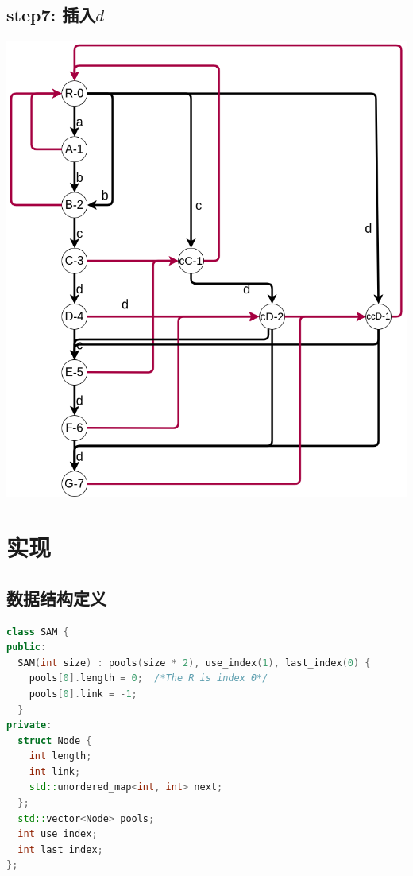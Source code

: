 \documentclass{article}
\begin{document}
\subsection{step7: 插入$d$}
\includegraphics[scale=0.5]{step7.png} \par

\section{实现}
\subsection{数据结构定义}
\begin{lstlisting}[language=C++, caption={Definition}]
class SAM {
public:
  SAM(int size) : pools(size * 2), use_index(1), last_index(0) {
    pools[0].length = 0;  /*The R is index 0*/
    pools[0].link = -1;
  }
private:
  struct Node {
    int length;
    int link;
    std::unordered_map<int, int> next;
  };
  std::vector<Node> pools;
  int use_index;
  int last_index;
};
\end{lstlisting}
\end{document}
